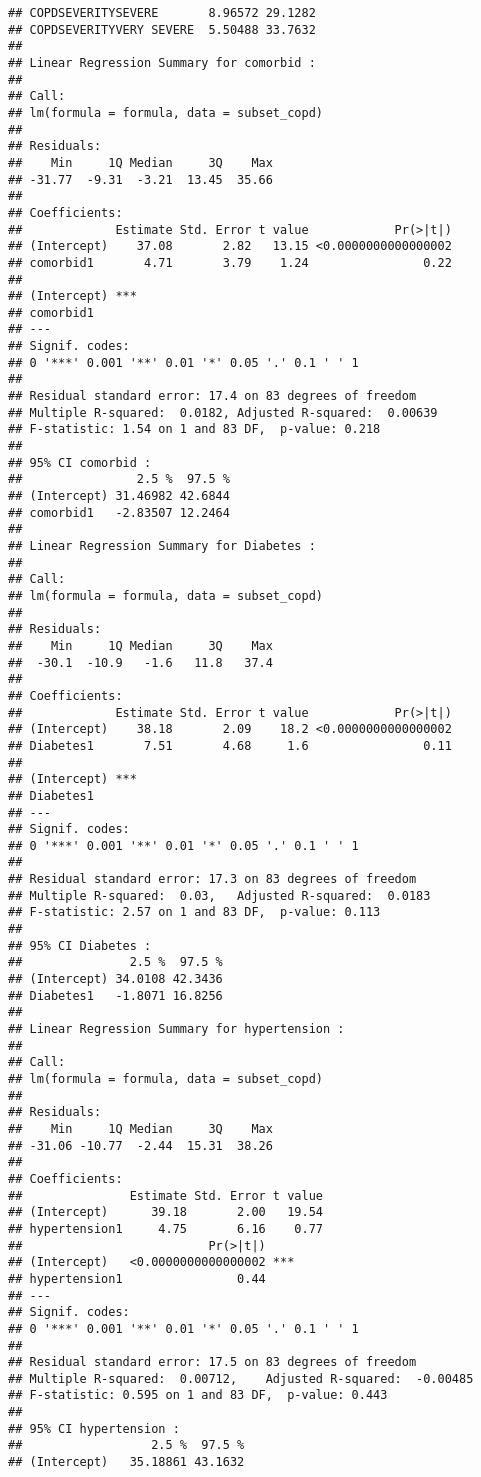 \documentclass[
]{article}
\begin{document}
\begin{verbatim}
## COPDSEVERITYSEVERE       8.96572 29.1282
## COPDSEVERITYVERY SEVERE  5.50488 33.7632
## 
## Linear Regression Summary for comorbid :
## 
## Call:
## lm(formula = formula, data = subset_copd)
## 
## Residuals:
##    Min     1Q Median     3Q    Max 
## -31.77  -9.31  -3.21  13.45  35.66 
## 
## Coefficients:
##             Estimate Std. Error t value            Pr(>|t|)
## (Intercept)    37.08       2.82   13.15 <0.0000000000000002
## comorbid1       4.71       3.79    1.24                0.22
##                
## (Intercept) ***
## comorbid1      
## ---
## Signif. codes:  
## 0 '***' 0.001 '**' 0.01 '*' 0.05 '.' 0.1 ' ' 1
## 
## Residual standard error: 17.4 on 83 degrees of freedom
## Multiple R-squared:  0.0182, Adjusted R-squared:  0.00639 
## F-statistic: 1.54 on 1 and 83 DF,  p-value: 0.218
## 
## 95% CI comorbid :
##                2.5 %  97.5 %
## (Intercept) 31.46982 42.6844
## comorbid1   -2.83507 12.2464
## 
## Linear Regression Summary for Diabetes :
## 
## Call:
## lm(formula = formula, data = subset_copd)
## 
## Residuals:
##    Min     1Q Median     3Q    Max 
##  -30.1  -10.9   -1.6   11.8   37.4 
## 
## Coefficients:
##             Estimate Std. Error t value            Pr(>|t|)
## (Intercept)    38.18       2.09    18.2 <0.0000000000000002
## Diabetes1       7.51       4.68     1.6                0.11
##                
## (Intercept) ***
## Diabetes1      
## ---
## Signif. codes:  
## 0 '***' 0.001 '**' 0.01 '*' 0.05 '.' 0.1 ' ' 1
## 
## Residual standard error: 17.3 on 83 degrees of freedom
## Multiple R-squared:  0.03,   Adjusted R-squared:  0.0183 
## F-statistic: 2.57 on 1 and 83 DF,  p-value: 0.113
## 
## 95% CI Diabetes :
##               2.5 %  97.5 %
## (Intercept) 34.0108 42.3436
## Diabetes1   -1.8071 16.8256
## 
## Linear Regression Summary for hypertension :
## 
## Call:
## lm(formula = formula, data = subset_copd)
## 
## Residuals:
##    Min     1Q Median     3Q    Max 
## -31.06 -10.77  -2.44  15.31  38.26 
## 
## Coefficients:
##               Estimate Std. Error t value
## (Intercept)      39.18       2.00   19.54
## hypertension1     4.75       6.16    0.77
##                          Pr(>|t|)    
## (Intercept)   <0.0000000000000002 ***
## hypertension1                0.44    
## ---
## Signif. codes:  
## 0 '***' 0.001 '**' 0.01 '*' 0.05 '.' 0.1 ' ' 1
## 
## Residual standard error: 17.5 on 83 degrees of freedom
## Multiple R-squared:  0.00712,    Adjusted R-squared:  -0.00485 
## F-statistic: 0.595 on 1 and 83 DF,  p-value: 0.443
## 
## 95% CI hypertension :
##                  2.5 %  97.5 %
## (Intercept)   35.18861 43.1632

\end{verbatim}
\end{document}
